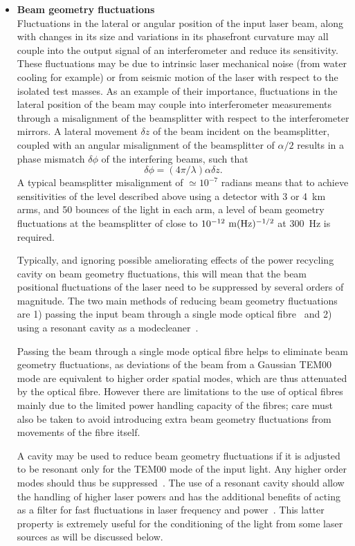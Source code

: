 \documentclass{article}
\begin{document}
\begin{itemize}
\item {\bf Beam geometry fluctuations} \\
  Fluctuations in the lateral or angular position of the input laser
  beam, along with changes in its size and variations in its
  phasefront curvature may all couple into the output signal of an
  interferometer and reduce its sensitivity. These fluctuations may be
  due to intrinsic laser mechanical noise (from water cooling for
  example) or from seismic motion of the laser with respect to the
  isolated test masses. As an example of their importance,
  fluctuations in the lateral position of the beam may couple into
  interferometer measurements through a misalignment of the
  beamsplitter with respect to the interferometer mirrors. A lateral
  movement $\delta z$ of the beam incident on the beamsplitter,
  coupled with an angular misalignment of the beamsplitter of
  $\alpha/2$ results in a phase mismatch $\delta \phi$ of the
  interfering beams, such that~\cite{Rudiger}
  \begin{equation}
    \delta \phi = (4 \pi/\lambda) \alpha \delta z.
    \label{equation:beamgeomfluc}
  \end{equation}
  A typical beamsplitter misalignment of $\simeq 10^{-7}$
  radians means that to achieve sensitivities of the level described
  above using a detector with 3 or 4~km arms, and 50 bounces of the
  light in each arm, a level of beam geometry fluctuations at the
  beamsplitter of close to $10^{-12}{\rm \ m}(\rm Hz)^{-1/2}$ at
  300~Hz is required.

  Typically, and ignoring possible ameliorating effects of the power
  recycling cavity on beam geometry fluctuations, this will mean that
  the beam positional fluctuations of the laser need to be suppressed
  by several orders of magnitude. The two main methods of reducing
  beam geometry fluctuations are 1) passing the input beam through a
  single mode optical fibre~\cite{Meersphd} and 2) using a resonant
  cavity as a modecleaner~\cite{Rudiger, Skeldon, Willke, Araya}.

  Passing the beam through a single mode optical fibre helps to
  eliminate beam geometry fluctuations, as deviations of the beam from
  a Gaussian TEM00 mode are equivalent to higher order spatial modes,
  which are thus attenuated by the optical fibre.  However there are
  limitations to the use of optical fibres mainly due to the limited
  power handling capacity of the fibres; care must also be taken to
  avoid introducing extra beam geometry fluctuations from movements of
  the fibre itself.

  A cavity may be used to reduce beam geometry fluctuations if it is
  adjusted to be resonant only for the TEM00 mode of the input light.
  Any higher order modes should thus be suppressed~\cite{Rudiger}.
  The use of a resonant cavity should allow the handling of higher
  laser powers and has the additional benefits of acting as
  a filter for fast fluctuations in laser frequency and
  power~\cite{Skeldon, Willke}. This latter property is extremely
  useful for the conditioning of the light from some laser sources as
  will be discussed below.
\end{itemize}
\end{document}
